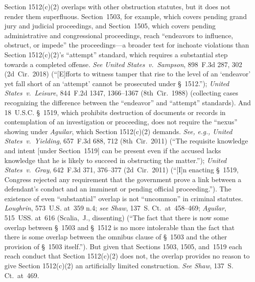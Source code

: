 Section 1512(c)(2) overlaps with other obstruction statutes, but it does not render them superfluous.
Section~1503, for example, which covers pending grand jury and judicial proceedings, and Section~1505, which covers pending administrative and congressional proceedings, reach ``endeavors to influence, obstruct, or impede'' the proceedings---a broader test for inchoate violations than Section 1512(c)(2)'s ``attempt'' standard, which requires a substantial step towards a completed offense.
\textit{See United States~v.\ Sampson}, 898~F.3d 287, 302 (2d~Cir.~2018) (``[E]fforts to witness tamper that rise to the level of an `endeavor' yet fall short of an `attempt' cannot be prosecuted under \S~1512.'');
\textit{United States~v.\ Leisure}, 844~F.2d 1347, 1366--1367 (8th~Cir.~1988) (collecting cases recognizing the difference between the ``endeavor'' and ``attempt'' standards).
And 18~U.S.C. \S~1519, which prohibits destruction of documents or records in contemplation of an investigation or proceeding, does not require the ``nexus'' showing under \textit{Aguilar}, which Section 1512(c)(2) demands.
\textit{See, e.g., United States~v.\ Yielding}, 657~F.3d 688, 712 (8th~Cir.~2011) (``The requisite knowledge and intent [under Section~1519] can be present even if the accused lacks knowledge that he is likely to succeed in obstructing the matter.'');
\textit{United States~v.\ Gray}, 642~F.3d 371, 376--377 (2d~Cir.~2011) (``[I]n enacting \S~1519, Congress rejected any requirement that the government prove a link between a defendant's conduct and an imminent or pending official proceeding.'').
The existence of even ``substantial'' overlap is not ``uncommon'' in criminal statutes.
\textit{Loughrin}, 573~U.S. at~359 n.4;
\textit{see Shaw}, 137~S. Ct.~at~458--469;
\textit{Aguilar}, 515~USS. at~616 (Scalia,~J., dissenting) (``The fact that there is now some overlap between \S~1503 and \S~1512 is no more intolerable than the fact that there is some overlap between the omnibus clause of \S~1503 and the other provision of \S~1503 itself.'').
But given that Sections 1503, 1505, and~1519 each reach conduct that Section 1512(c)(2) does not, the overlap provides no reason to give Section 1512(c)(2) an artificially limited construction.
\textit{See Shaw}, 137~S. Ct.~at~469.%
